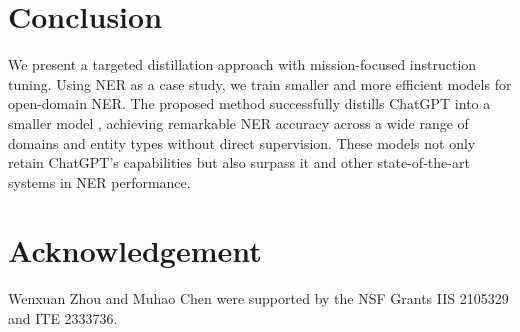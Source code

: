 \section{Conclusion}
We present a targeted distillation approach with mission-focused instruction tuning. Using NER as a case study, we train smaller and more efficient models for open-domain NER. The proposed method successfully distills ChatGPT into a smaller model \longname{}, achieving remarkable NER accuracy across a wide range of domains and entity types without direct supervision. These models not only retain ChatGPT's capabilities but also surpass it and other state-of-the-art systems in NER performance.

\section*{Acknowledgement}

Wenxuan Zhou and Muhao Chen were supported by the NSF Grants IIS 2105329 and ITE 2333736.

\newpage

